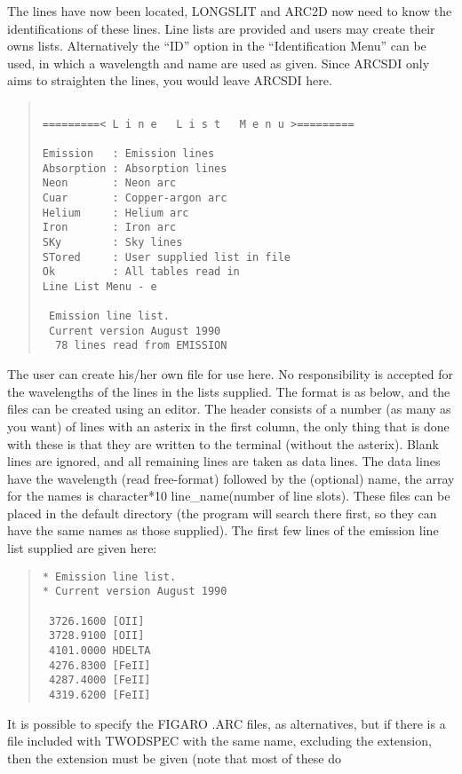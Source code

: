 The lines have now been located, LONGSLIT and ARC2D now need to know the
identifications of these lines.
Line lists are provided and users may create their owns lists.
Alternatively the ``ID'' option in the ``Identification Menu'' can be
used, in which a wavelength and name are used as given.
Since ARCSDI only aims to straighten the lines, you would leave ARCSDI
here.
\begin{quote}\begin{verbatim}

=========< L i n e   L i s t   M e n u >=========

Emission   : Emission lines
Absorption : Absorption lines
Neon       : Neon arc
Cuar       : Copper-argon arc
Helium     : Helium arc
Iron       : Iron arc
SKy        : Sky lines
STored     : User supplied list in file
Ok         : All tables read in
Line List Menu - e

 Emission line list.
 Current version August 1990
  78 lines read from EMISSION
\end{verbatim}\end{quote}
The user can create his/her own file for use here.
No responsibility is accepted for the wavelengths of the lines in the
lists supplied.
The format is as below, and the files can be created using an editor.
The header consists of a number (as many as you want) of lines with an
asterix in the first column, the only thing that is done with
these is that they are written to the terminal (without the asterix).
Blank lines are ignored, and all remaining lines are taken as data lines.
The data lines have the wavelength (read free-format) followed by the
(optional) name, the array for the names is character*10 line\_name(number
of line slots).
These files can be placed in the default directory (the program will
search there first, so they can have the same names as those supplied).
The first few lines of the emission line list supplied are given here:
\begin{quote}\begin{verbatim}
* Emission line list.
* Current version August 1990

 3726.1600 [OII]
 3728.9100 [OII]
 4101.0000 HDELTA
 4276.8300 [FeII]
 4287.4000 [FeII]
 4319.6200 [FeII]
\end{verbatim}\end{quote}
It is possible to specify the FIGARO .ARC files, as alternatives, but if
there is a file included with TWODSPEC with the same name, excluding the
extension, then the extension must be given (note that most of these do
